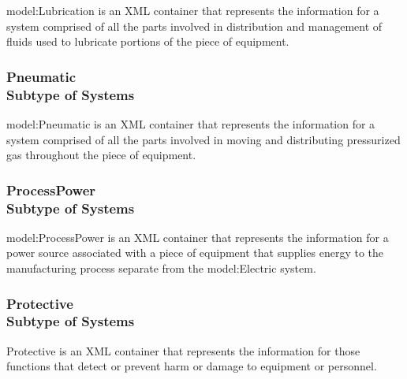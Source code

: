 \FloatBarrier

{model:Lubrication} is an XML container that represents the information for a system comprised of all the parts involved in distribution and management of fluids used to lubricate portions of the piece of equipment.

\FloatBarrier
\subsubsection[Pneumatic]{Pneumatic \\ {\small Subtype of Systems}}
  \label{type:Pneumatic}

\FloatBarrier

{model:Pneumatic} is an XML container that represents the information for a system comprised of all the parts involved in moving and distributing pressurized gas throughout the piece of equipment.

\FloatBarrier
\subsubsection[ProcessPower]{ProcessPower \\ {\small Subtype of Systems}}
  \label{type:ProcessPower}

\FloatBarrier

{model:ProcessPower} is an XML container that represents the information for a power source associated with a piece of equipment that supplies energy to the manufacturing process separate from the {model:Electric} system.

\FloatBarrier
\subsubsection[Protective]{Protective \\ {\small Subtype of Systems}}
  \label{type:Protective}

\FloatBarrier

Protective is an XML container that represents the information for those functions that detect or prevent harm or damage to equipment or personnel.

\FloatBarrier
